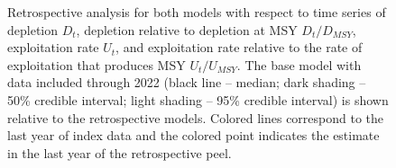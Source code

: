 \documentclass[
  11pt,
]{SCreport}
\begin{document}
\begin{figure}[H]


\caption{\label{fig-retro}Retrospective analysis for both models with
respect to time series of depletion \(D_t\), depletion relative to
depletion at MSY \(D_t/D_{MSY}\), exploitation rate \(U_t\), and
exploitation rate relative to the rate of exploitation that produces MSY
\(U_t/U_{MSY}\). The base model with data included through 2022 (black
line -- median; dark shading -- 50\% credible interval; light shading --
95\% credible interval) is shown relative to the retrospective models.
Colored lines correspond to the last year of index data and the colored
point indicates the estimate in the last year of the retrospective
peel.}

\end{figure}%

\newpage
\end{document}
